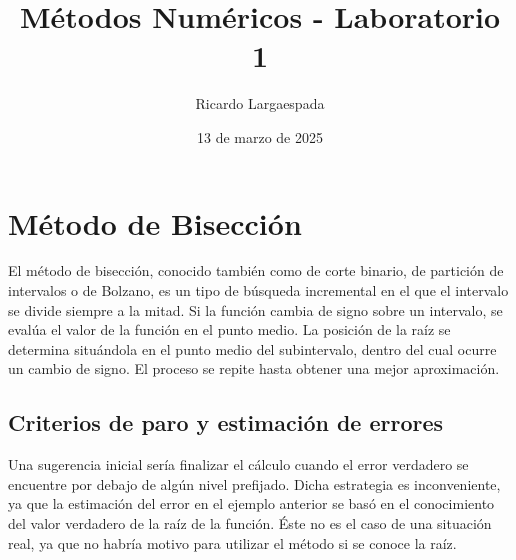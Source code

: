 \documentclass[12pt,letterpaper]{article}
\theoremstyle{definition}
\theoremstyle{plain}
\theoremstyle{remark}
\begin{document}
\author{Ricardo Largaespada}
\title{Métodos Numéricos - Laboratorio 1}
\date{13 de marzo de 2025}
\maketitle


\section{Método de Bisección}
El método de bisección, conocido también como de corte binario, de partición de intervalos o de Bolzano, es un tipo de búsqueda incremental en el que el intervalo se divide siempre a la mitad. Si la función cambia de signo sobre un intervalo, se evalúa el valor de la función en el punto medio. La posición de la raíz se determina situándola en el punto medio del subintervalo, dentro del cual ocurre un cambio de signo. El proceso se repite hasta obtener una mejor aproximación.

\subsection{Criterios de paro y estimación de errores}
Una sugerencia inicial sería finalizar el cálculo cuando el error verdadero se encuentre por debajo de algún nivel prefijado. Dicha estrategia es inconveniente, ya que la estimación del error en el ejemplo anterior se basó en el conocimiento del valor verdadero de la raíz de la función. Éste no es el caso de una situación real, ya que no habría motivo para utilizar el método si se conoce la raíz.\\
\end{document}
